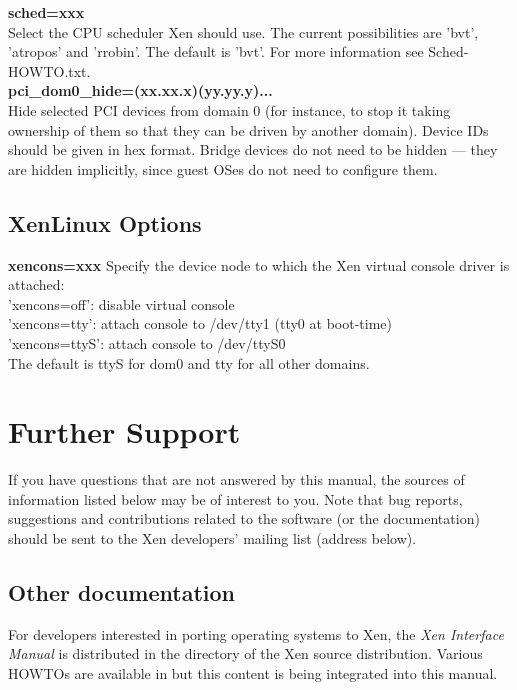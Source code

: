 \documentclass[11pt,twoside,final,openright]{xenstyle}
\begin{document}
{{\bf sched=xxx } \\
 Select the CPU scheduler Xen should use.  The current
 possibilities are 'bvt', 'atropos' and 'rrobin'.  The
 default is 'bvt'.  For more information see
 Sched-HOWTO.txt. \\

{\bf pci\_dom0\_hide=(xx.xx.x)(yy.yy.y)... } \\
Hide selected PCI devices from domain 0 (for instance, to stop it
taking ownership of them so that they can be driven by another
domain).  Device IDs should be given in hex format.  Bridge devices do
not need to be hidden --- they are hidden implicitly, since guest OSes
do not need to configure them.

\section{XenLinux Options}

{\bf xencons=xxx}
Specify the device node to
which the Xen virtual console driver is attached: \\
 'xencons=off': disable virtual console \\
 'xencons=tty': attach console to /dev/tty1 (tty0 at boot-time) \\
 'xencons=ttyS': attach console to /dev/ttyS0\\
The default is ttyS for dom0 and tty for all other domains.

\chapter{Further Support}

If you have questions that are not answered by this manual, the
sources of information listed below may be of interest to you.  Note
that bug reports, suggestions and contributions related to the
software (or the documentation) should be sent to the Xen developers'
mailing list (address below).

\section{Other documentation}

For developers interested in porting operating systems to Xen, the
{\em Xen Interface Manual} is distributed in the 
directory of the Xen source distribution.  Various HOWTOs are
available in  but this content is being integrated
into this manual.

}
\end{document}
